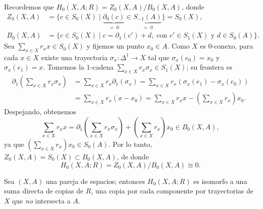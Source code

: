 \begin{dem}
Recordemos que $H_0(X, A; R) = Z_0(X, A)/B_0(X, A)$, donde
\begin{align*}
Z_0(X, A) &= \{ c \in S_0(X) \mid \underbrace{\partial_0(c)}_{=\;0} \in \underbrace{S_{-1}(A)}_{=\;0} \} = S_0(X), \\
B_0(X, A) &= \{ c \in S_0(X) \mid c = \partial_1(c') + d, \; \text{con } c' \in S_1(X) \text{ y } d \in S_0(A) \}.
\end{align*}
Sea $\sum_{x \in X} r_x x \in S_0(X)$ y fijemos un punto $x_0 \in A$. Como $X$ es $0$-conexo, para cada $x \in X$ existe una trayectoria $\sigma_x \colon \Delta^1 \to X$ tal que $\sigma_x(e_0) = x_0$ y $\sigma_x(e_1) = x$. Tomemos la $1$-cadena $\sum_{x \in X} r_x \sigma_x \in S_1(X)$; su frontera es
\begin{align*}
\partial_1\left(\sum_{x \in X} r_x \sigma_x\right) &= \sum_{x \in X} r_x \partial_1(\sigma_x) = \sum_{x \in X} r_x (\sigma_x(e_1) - \sigma_x(e_0)) \\
&= \sum_{x \in X} r_x (x - x_0) = \sum_{x \in X} r_x x - \left(\sum_{x \in X} r_x\right) x_0.
\end{align*}
Despejando, obtenemos
\[
\sum_{x \in X} r_x x = \partial_1\left(\sum_{x \in X} r_x \sigma_x\right) + \left(\sum_{x \in X} r_x\right) x_0 \in B_0(X, A),
\]
ya que $\left(\sum_{x \in X} r_x\right) x_0 \in S_0(A)$. Por lo tanto, $Z_0(X, A) = S_0(X) \subset B_0(X, A)$, de donde
\[
H_0(X, A; R) = Z_0(X, A)/B_0(X, A) \cong 0.
\]
\end{dem}

\begin{prop}
Sea $(X, A)$ una pareja de espacios; entonces $H_0(X, A; R)$ es isomorfo a una suma directa de copias de $R$, una copia por cada componente por trayectorias de $X$ que \textit{no} intersecta a $A$.
\end{prop}

